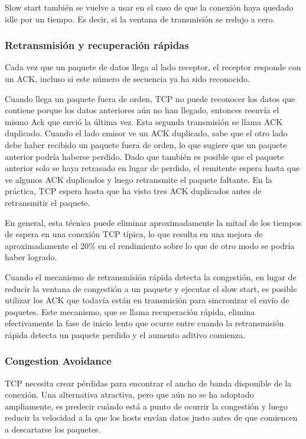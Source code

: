 Slow start también se vuelve a usar en el caso de que la conexión haya quedado idle por un tiempo. Es decir, si la ventana de transmisión se redujo a cero.

\subsubsection*{Retransmisión y recuperación rápidas}
Cada vez que un paquete de datos llega al lado receptor, el receptor responde con un ACK, incluso si este número de secuencia ya ha sido reconocido. 

Cuando llega un paquete fuera de orden, TCP no puede reconocer los datos que contiene porque los datos anteriores aún no han llegado, entonces reenvía el mismo Ack que envió la última vez. Esta segunda transmisión se llama ACK duplicado. Cuando el lado emisor ve un ACK duplicado, sabe que el otro lado debe haber recibido un paquete fuera de orden, lo que sugiere que un paquete anterior podría haberse perdido. Dado que también es posible que el paquete anterior solo se haya retrasado en lugar de perdido, el remitente espera hasta que ve algunos ACK duplicados y luego retransmite el paquete faltante. En la práctica, TCP espera hasta que ha visto tres ACK duplicados antes de retransmitir el paquete.

En general, esta técnica puede eliminar aproximadamente la mitad de los tiempos de espera en una conexión TCP típica, lo que resulta en una mejora de aproximadamente el 20\% en el rendimiento sobre lo que de otro modo se podría haber logrado. 

Cuando el mecanismo de retransmisión rápida detecta la congestión, en lugar de reducir la ventana de congestión a un paquete y ejecutar el slow start, es posible utilizar los ACK que todavía están en transmición para sincronizar el envío de paquetes. Este mecanismo, que se llama recuperación rápida, elimina efectivamente la fase de inicio lento que ocurre entre cuando la retransmisión rápida detecta un paquete perdido y el aumento aditivo comienza.

\subsubsection{Congestion Avoidance}
TCP necesita crear pérdidas para encontrar el ancho de banda disponible de la conexión. Una alternativa atractiva, pero que aún no se ha adoptado ampliamente, es predecir cuándo está a punto de ocurrir la congestión y luego reducir la velocidad a la que los hosts envían datos justo antes de que comiencen a descartarse los paquetes.

